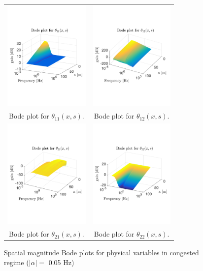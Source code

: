 \documentclass[5p,twocolumn]{elsarticle}
\begin{document}
\begin{figure}
\centering
\begin{tabular}{cc}
\includegraphics[trim = 0mm 60mm 0mm 60mm, width = 4.2cm]{distr_theta_11}
&
\includegraphics[trim = 0mm 60mm 0mm 60mm, width = 4.2cm]{distr_theta_12}
\tabularnewline
Bode plot for $\theta_{11}(x,s)$.
&
Bode plot for $\theta_{12}(x,s)$.
\tabularnewline
\includegraphics[trim = 0mm 60mm 0mm 60mm, width = 4.2cm]{distr_theta_21}
&
\includegraphics[trim = 0mm 60mm 0mm 60mm, width = 4.2cm]{distr_theta_22}
\tabularnewline
Bode plot for $\theta_{21}(x,s)$.
&
Bode plot for $\theta_{22}(x,s)$.
\tabularnewline
\end{tabular}
\caption{Spatial magnitude Bode plots for physical variables in congested regime ($\left|\alpha\right| = $ 0.05 Hz)\label{fig:Magn_spatial_physx_congested}}
\end{figure}
\end{document}
